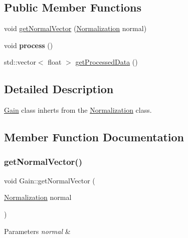 \subsection*{Public Member Functions}
\begin{DoxyCompactItemize}
\item 
void \hyperlink{classGain_a03448a6ed5572cb770e2b0d79be8b626}{get\+Normal\+Vector} (\hyperlink{classNormalization}{Normalization} normal)
\item 
\mbox{\label{classGain_a5365c8550d520fade2eaeea2f7f641b2}} 
void {\bfseries process} ()
\item 
std\+::vector$<$ float $>$ \hyperlink{classGain_a68ccd47e436b388ec3d62d953804daf2}{get\+Processed\+Data} ()
\end{DoxyCompactItemize}


\subsection{Detailed Description}
\hyperlink{classGain}{Gain} class inherts from the \hyperlink{classNormalization}{Normalization} class. 

\subsection{Member Function Documentation}
\mbox{\label{classGain_a03448a6ed5572cb770e2b0d79be8b626}} 
\subsubsection{\texorpdfstring{get\+Normal\+Vector()}{getNormalVector()}}
{\footnotesize\ttfamily void Gain\+::get\+Normal\+Vector (\begin{DoxyParamCaption}\item[{\hyperlink{classNormalization}{Normalization}}]{normal }\end{DoxyParamCaption})}


\begin{DoxyParams}{Parameters}
{\em normal} & \\
\hline
\end{DoxyParams}
\mbox{\label{classGain_a68ccd47e436b388ec3d62d953804daf2}} 
